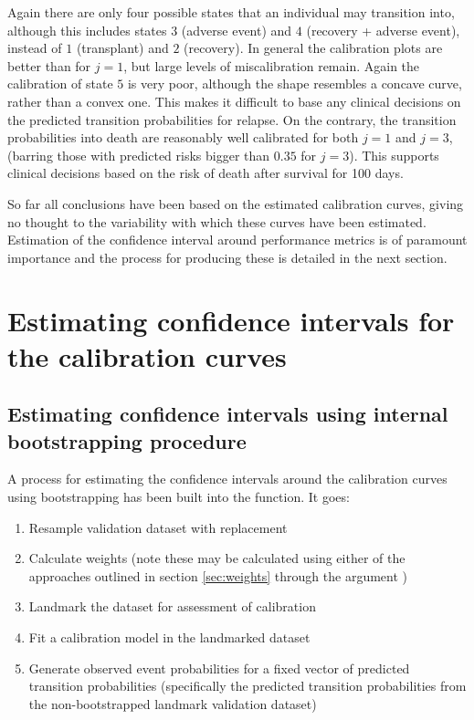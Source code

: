 \documentclass[nojss]{jss}
\begin{document}
Again there are only four possible states that an individual may transition into, although this includes states $3$ (adverse event) and $4$ (recovery + adverse event), instead of $1$ (transplant) and $2$ (recovery). In general the calibration plots are better than for $j = 1$, but large levels of miscalibration remain. Again the calibration of state $5$ is very poor, although the shape resembles a concave curve, rather than a convex one. This makes it difficult to base any clinical decisions on the predicted transition probabilities for relapse. On the contrary, the transition probabilities into death are reasonably well calibrated for both $j = 1$ and $j = 3$, (barring those with predicted risks bigger than $0.35$ for $j = 3$). This supports clinical decisions based on the risk of death after survival for 100 days.

So far all conclusions have been based on the estimated calibration curves, giving no thought to the variability with which these curves have been estimated. Estimation of the confidence interval around performance metrics is of paramount importance and the process for producing these is detailed in the next section.

\section{Estimating confidence intervals for the calibration curves} \label{sec:calibci}

\subsection{Estimating confidence intervals using internal bootstrapping procedure} \label{sec:internalci}

A process for estimating the confidence intervals around the calibration curves using bootstrapping has been built into the  function. It goes:

\begin{enumerate}
 \item Resample validation dataset with replacement
 \item Calculate weights (note these may be calculated using either of the approaches outlined in section \ref{sec:weights} through the argument )
 \item Landmark the dataset for assessment of calibration
 \item Fit a calibration model in the landmarked dataset
 \item Generate observed event probabilities for a fixed vector of predicted transition probabilities (specifically the predicted transition probabilities from the non-bootstrapped landmark validation dataset)
\end{enumerate}
\end{document}
